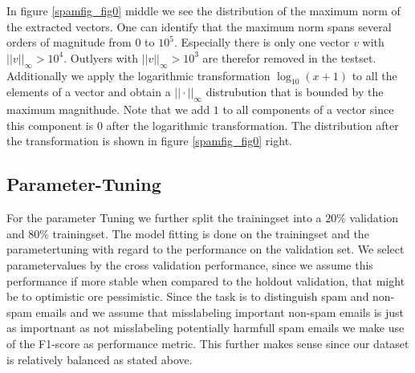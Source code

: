 \documentclass[11pt]{article}
\begin{document}
In figure \ref{spamfig_fig0} middle we see the distribution of the maximum norm of the extracted vectors. One can identify that the maximum norm spans several orders of magnitude from $0$ to $10^5$. Especially there is only one vector $v$ with $||v||_\infty>10^4$. Outlyers with $||v||_\infty>10^3$ are therefor removed in the testset. Additionally we apply the logarithmic transformation $\log_{10}(x+1)$ to all the elements of a vector and obtain a $||\cdot||_\infty$ distrubution that is bounded by the maximum magnithude. Note that we add $1$ to all components of a vector since this component is $0$ after the logarithmic transformation. The distribution after the transformation is shown in figure \ref{spamfig_fig0} right.




\subsection{Parameter-Tuning}
For the parameter Tuning we further split the trainingset into a $20\%$ validation and $80\%$ trainingset. The model fitting is done on the trainingset and the parametertuning with regard to the performance on the validation set. We select parametervalues by the cross validation performance, since we assume this performance if more stable when compared to the holdout validation, that might be to optimistic ore pessimistic. Since the task is to distinguish spam and non-spam emails and we assume that misslabeling important non-spam emails is just as importnant as not misslabeling potentially harmfull spam emails we make use of the F1-score as performance metric. This further makes sense since our dataset is relatively balanced as stated above.
%
\newline
\end{document}
